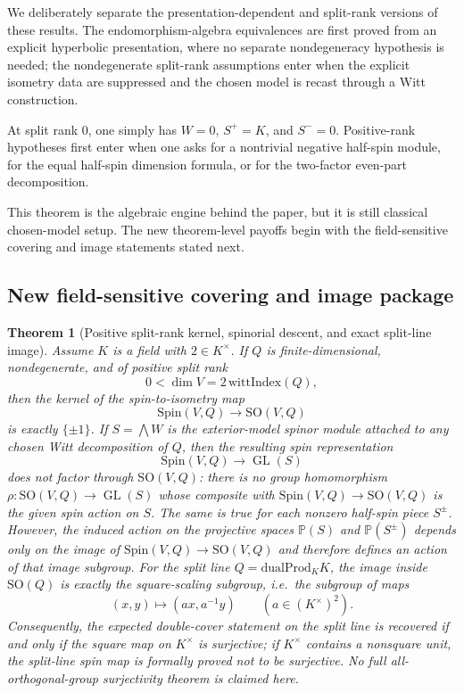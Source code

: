\documentclass[11pt,a4paper]{article}
\theoremstyle{plain}
\newtheorem{theorem}{Theorem}[section]
\theoremstyle{definition}
\theoremstyle{remark}
\newcommand{\Spin}{\mathrm{Spin}}
\newcommand{\SO}{\mathrm{SO}}
\newcommand{\dualProd}{\mathrm{dualProd}}
\begin{document}
We deliberately separate the presentation-dependent and split-rank
versions of these results. The endomorphism-algebra equivalences are
first proved from an explicit hyperbolic presentation, where no separate
nondegeneracy hypothesis is needed; the nondegenerate split-rank assumptions
enter when the explicit isometry data are suppressed and the chosen model is
recast through a Witt construction.

At split rank $0$, one simply has $W=0$, $S^+=K$, and $S^-=0$. Positive-rank
hypotheses first enter when one asks for a nontrivial negative half-spin module,
for the equal half-spin dimension formula, or for the two-factor even-part
decomposition.

This theorem is the algebraic engine behind the paper, but it is still
classical chosen-model setup. The new theorem-level payoffs begin with the
field-sensitive covering and image statements stated next.

\subsection*{New field-sensitive covering and image package}

\begin{theorem}[Positive split-rank kernel, spinorial descent, and exact split-line image]
\label{thm:kernel-nonfactor-split-line}
Assume $K$ is a field with $2\in K^\times$. If $Q$ is finite-dimensional,
nondegenerate, and of positive split rank
\[
  0<\dim V = 2\,\mathrm{wittIndex}(Q),
\]
then the kernel of the spin-to-isometry map
\[
  \Spin(V,Q) \to \SO(V,Q)
\]
is exactly $\{\pm1\}$. If $S=\bigwedge W$ is the exterior-model spinor module
attached to any chosen Witt decomposition of $Q$, then the resulting spin
representation
\[
  \Spin(V,Q) \to \operatorname{GL}(S)
\]
does not factor through $\SO(V,Q)$: there is no group homomorphism
$\rho:\SO(V,Q)\to \operatorname{GL}(S)$ whose composite with
$\Spin(V,Q)\to\SO(V,Q)$ is the given spin action on $S$. The same is true for
each nonzero half-spin piece $S^\pm$. However, the induced action on the
projective spaces $\mathbb{P}(S)$ and $\mathbb{P}(S^\pm)$ depends only on the
image of $\Spin(V,Q)\to\SO(V,Q)$ and therefore defines an action of that image
subgroup. For the split line $Q=\dualProd_K K$, the image inside $\SO(Q)$ is
exactly the square-scaling subgroup, i.e.\ the subgroup of maps
\[
  (x,y)\longmapsto (a x, a^{-1} y)
  \qquad (a\in (K^\times)^2).
\]
Consequently, the expected double-cover statement on the split line is recovered
if and only if the square map on $K^\times$ is surjective; if $K^\times$
contains a nonsquare unit, the split-line spin map is formally proved not to be
surjective. No full all-orthogonal-group surjectivity theorem is claimed here.
\end{theorem}
\end{document}
